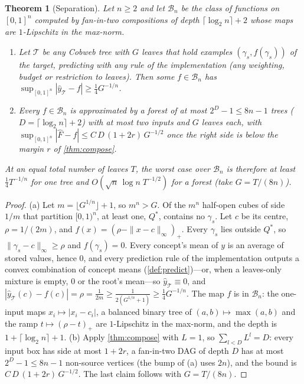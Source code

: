 \documentclass[11pt]{article}
\newtheorem{theorem}{Theorem}
\theoremstyle{definition}
\theoremstyle{remark}
\newcommand{\T}{\mathcal{T}}
\newcommand{\hy}{\hat{y}}
\begin{document}
\begin{theorem}[Separation]\label{thm:separation}
Let $n\ge2$ and let $\mathcal B_n$ be the class of functions on $[0,1]^n$ computed by fan-in-two
compositions of depth $\lceil\log_2n\rceil+2$ whose maps are $1$-Lipschitz in the max-norm.
\begin{enumerate}[label=(\alph*),leftmargin=*,noitemsep]
\item Let $\T$ be any Cobweb tree with $G$ leaves that hold examples $(\gamma_s,f(\gamma_s))$ of the
  target, predicting with any rule of the implementation (any weighting, budget or
  restriction to leaves).  Then some $f\in\mathcal B_n$ has $\sup_{[0,1]^n}|\hy_\T-f|\ge
  \tfrac14G^{-1/n}$.
\item Every $f\in\mathcal B_n$ is approximated by a forest of at most $2^D-1\le8n-1$ trees
  ($D=\lceil\log_2n\rceil+2$) with at most two inputs and $G$ leaves each, with
  $\sup_{[0,1]^n}|\hat F-f|\le C\,D\,(1+2r)\,G^{-1/2}$ once the right side is below the margin $r$
  of \cref{thm:compose}.
\end{enumerate}
At an equal total number of leaves $T$, the worst case over $\mathcal B_n$ is therefore at least
$\tfrac14T^{-1/n}$ for one tree and $O(\sqrt n\,\log n\;T^{-1/2})$ for a forest (take $G=T/(8n)$).
\end{theorem}

\begin{proof}
(a) Let $m=\lfloor G^{1/n}\rfloor+1$, so $m^n>G$.  Of the $m^n$ half-open cubes of side $1/m$ that
partition $[0,1)^n$, at least one, $Q^*$, contains no $\gamma_s$.  Let $c$ be its centre,
$\rho=1/(2m)$, and $f(x)=(\rho-\|x-c\|_\infty)_+$.  Every $\gamma_s$ lies outside $Q^*$, so
$\|\gamma_s-c\|_\infty\ge\rho$ and $f(\gamma_s)=0$.  Every concept's mean of $y$ is an average of
stored values, hence $0$, and every prediction rule of the implementation outputs a convex
combination of concept means (\cref{def:predict})---or, when a leaves-only mixture is empty,
$0$ or the root's mean---so $\hy_\T\equiv0$, and
$|\hy_\T(c)-f(c)|=\rho=\frac1{2m}\ge\frac1{2(G^{1/n}+1)}\ge\frac14G^{-1/n}$.  The map $f$ is in
$\mathcal B_n$: the one-input maps $x_i\mapsto|x_i-c_i|$, a balanced binary tree of
$(a,b)\mapsto\max(a,b)$ and the ramp $t\mapsto(\rho-t)_+$ are $1$-Lipschitz in the max-norm, and
the depth is $1+\lceil\log_2n\rceil+1$.
(b) Apply \cref{thm:compose} with $L=1$, so $\sum_{l<D}L^l=D$: every input box has side at most
$1+2r$, a fan-in-two DAG of depth $D$ has at most $2^D-1\le8n-1$ non-source vertices (the
bump of (a) uses $2n$), and the bound is $C\,D\,(1+2r)\,G^{-1/2}$.  The last claim follows with
$G=T/(8n)$.
\end{proof}
\end{document}
